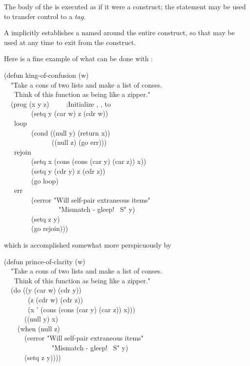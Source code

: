 \begin{defmac}
The body of the  is executed as if it were a 
construct; the  statement may be used to transfer control
to a \emph{tag}.

A  implicitly establishes a  named {\nil} around
the entire  construct, so that  may be used
at any time to exit from the  construct.

Here is a fine example of what can be done with :
\begin{lisp}
(defun king-of-confusion (w) \\
~~"Take a cons of two lists and make a list of conses. \\
~~~Think of this function as being like a zipper." \\
~~(prog (x y z)~~~~~;\textrm{Initialize , ,  to {\false}} \\
~~~~~~~~(setq y (car w) z (cdr w)) \\
~~~loop \\
~~~~~~~~(cond ((null y) (return x)) \\
~~~~~~~~~~~~~~((null z) (go err))) \\
~~~rejoin \\
~~~~~~~~(setq x (cons (cons (car y) (car z)) x)) \\
~~~~~~~~(setq y (cdr y) z (cdr z)) \\
~~~~~~~~(go loop) \\
~~~err \\
~~~~~~~~(cerror "Will self-pair extraneous items" \\
~~~~~~~~~~~~~~~~"Mismatch - gleep!  ~S" y) \\
~~~~~~~~(setq z y) \\
~~~~~~~~(go rejoin)))
\end{lisp}
which is accomplished somewhat more perspicuously by
\begin{lisp}
(defun prince-of-clarity (w) \\
~~"Take a cons of two lists and make a list of conses. \\
~~~Think of this function as being like a zipper." \\
~~(do ((y (car w) (cdr y)) \\
~~~~~~~(z (cdr w) (cdr z)) \\
~~~~~~~(x '{\emptylist} (cons (cons (car y) (car z)) x))) \\
~~~~~~((null y) x) \\
~~~~(when (null z) \\
~~~~~~(cerror "Will self-pair extraneous items" \\
~~~~~~~~~~~~~~"Mismatch - gleep!  ~S" y) \\
~~~~~~(setq z y))))
\end{lisp}


\end{defmac}
